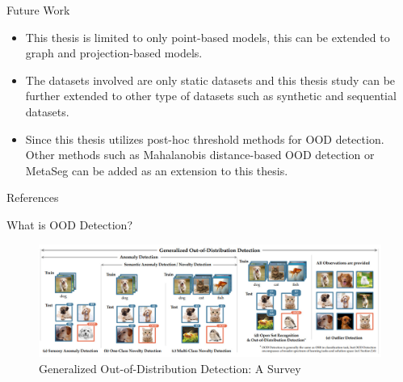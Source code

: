 \documentclass[aspectratio=169]{beamer}
\begin{document}
\begin{frame}{Future Work}
    \begin{itemize}
        \item This thesis is limited to only point-based models, this can be extended to graph and projection-based models.
        \item The datasets involved are only static datasets and this thesis study can be further extended to other type of datasets such as synthetic and sequential datasets.
        \item Since this thesis utilizes post-hoc threshold methods for OOD detection. Other methods such as Mahalanobis distance-based OOD detection \cite{lee2018simple_mahalanobis} or MetaSeg \cite{MetaSeg} can be added as an extension to this thesis.
    \end{itemize}
\end{frame}

\begin{frame}{References}
    
    

\end{frame}

\begin{frame}[noframenumbering]{What is OOD Detection?}
    \begin{figure}
        \centering
        \includegraphics[scale=0.3]{images/OOD_ex_new.jpg}
        \caption{Generalized Out-of-Distribution Detection: A Survey}
        \label{fig:my_label}
    \end{figure}
\end{frame}
\end{document}
